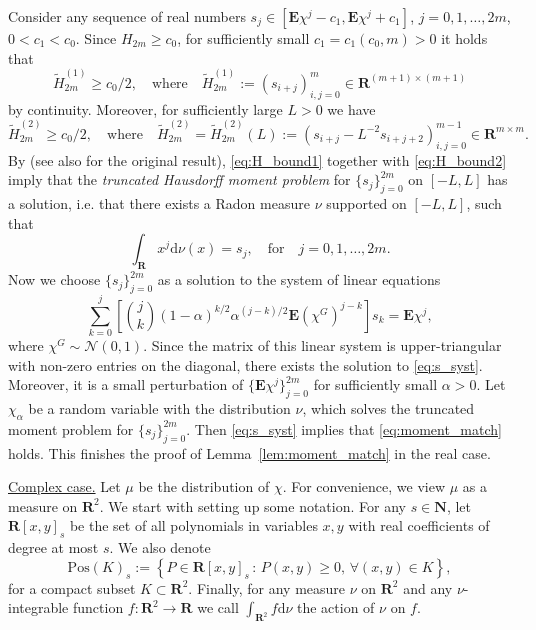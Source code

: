 \documentclass[10pt]{amsart}
\numberwithin{equation}{section}
\newcommand{\nc}{\normalcolor}
\newcommand{\dif}{\mathrm{d}}
\newcommand{\E}{\mathbf{E}}
\newcommand{\R}{\mathbf{R}}
\newcommand{\N}{\mathbf{N}}
\begin{document}
Consider any sequence of real numbers $s_j\in [\E \chi^j - c_1, \E \chi^j + c_1]$, $j=0,1,\ldots,2m$, $0<c_1<c_0$. Since $H_{2m}\ge c_0$, for sufficiently small $c_1=c_1(c_0,m)>0$ it holds that 
\begin{equation}
\widetilde{H}_{2m}^{(1)}\ge c_0/2,\quad\text{where}\quad \widetilde{H}_{2m}^{(1)}:=(s_{i+j})_{i,j=0}^m\in \R^{(m+1)\times (m+1)}
\label{eq:H_bound1}
\end{equation}
by continuity. Moreover, for sufficiently large $L>0$ we have
\begin{equation}
\widetilde{H}_{2m}^{(2)}\ge c_0/2,\quad\text{where}\quad\widetilde{H}_{2m}^{(2)} = \widetilde{H}_{2m}^{(2)}(L) :=\left( s_{i+j} -L^{-2}s_{i+j+2} \right)_{i,j=0}^{m-1}\in \R^{m\times m}.
\label{eq:H_bound2}
\end{equation}
By \cite[Theorem~3.1]{moment_problem} (see also \cite{Krein73} for the original result), \eqref{eq:H_bound1} together with \eqref{eq:H_bound2} imply that 
the \emph{truncated  Hausdorff \nc moment problem} for $\{s_j\}_{j=0}^{2m}$ on $[-L,L]$ has a solution, i.e. that there exists a Radon measure $\nu$ supported on $[-L, L]$, such that 
\begin{equation*}
\int_\R x^j\dif\nu(x)=s_j, \quad \text{for}\quad j=0,1,\ldots,2m.
\end{equation*}
Now we choose $\{s_j\}_{j=0}^{2m}$ as a solution to the system of linear equations
\begin{equation}
\sum_{k=0}^j \left[\binom{j}{k}(1-\alpha)^{k/2} \alpha^{(j-k)/2} \E (\chi^G)^{j-k}\right] s_k = \E \chi^j,
\label{eq:s_syst}
\end{equation}
where $\chi^G\sim\mathcal{N}(0,1)$. Since the matrix of this linear system is upper-triangular with non-zero entries on the diagonal, there exists the solution to \eqref{eq:s_syst}. Moreover, it is a small perturbation of $\{\E\chi^j\}_{j=0}^{2m}$ for sufficiently small $\alpha>0$. Let $\chi_\alpha$ be a random variable with the distribution $\nu$, which solves the truncated moment problem for $\{s_j\}_{j=0}^{2m}$. Then \eqref{eq:s_syst} implies that \eqref{eq:moment_match} holds. This finishes the proof of Lemma~\ref{lem:moment_match} in the real case.

\medskip

\noindent\underline{Complex case.}   Let $\mu$ be the distribution of $\chi$. \nc For convenience, we view $\mu$ as a measure on $\R^2$. We start with setting up some notation. For any $s\in \N$, let $\R[x,y]_s$ be the set of all polynomials in variables $x,y$ with real coefficients of degree at most $s$. We also denote
\begin{equation*}
\mathrm{Pos}(K)_s:=\left\lbrace P\in \R[x,y]_s\,:\, P(x,y)\ge 0, \, \forall (x,y)\in K\right\rbrace,
\end{equation*}
for a compact subset $K\subset \R^2$. Finally, for any measure $\nu$ on $\R^2$ and any $\nu$-integrable function $f:\R^2\to \R$ we call $\int_{\R^2} f\dif\nu$ the action of $\nu$ on $f$.
\end{document}
